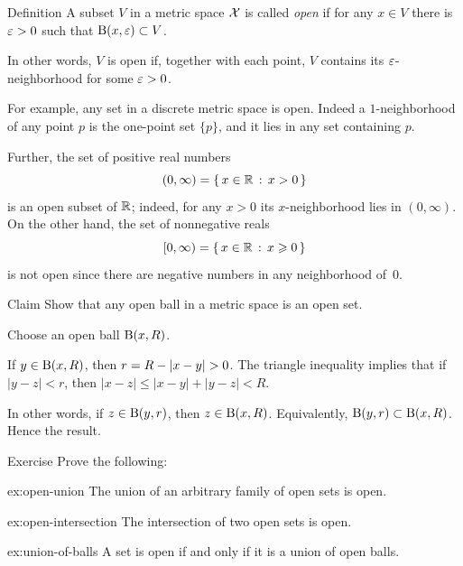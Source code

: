 \begin{thm}{Definition}\label{def:open}
A subset $V$ in a metric space $\mathcal{X}$ is called \emph{open} if for any $x\in V$ there is $\varepsilon>0$ such that $\mathrm{B}(x,\varepsilon)\subset V$.
\end{thm}

In other words, $V$ is open if, together with each point, $V$ contains its $\varepsilon$-neighborhood for some $\varepsilon>0$.

For example, any set in a discrete metric space is open.
Indeed a $1$-neighborhood of any point $p$ is the one-point set $\{p\}$, and it lies in any set containing $p$.

Further, the set of positive real numbers
\[(0,\infty)=\left\{\,{x\in\mathbb{R}}\,:\,{x>0}\,\right\}\] 
is an open subset of $\mathbb{R}$; indeed, for any $x>0$ its $x$-neighborhood lies in $(0,\infty)$.
On the other hand, the set of nonnegative reals 
\[[0,\infty)=\left\{\,{x\in\mathbb{R}}\,:\,{x\geqslant0}\,\right\}\]
is not open since there are negative numbers in any neighborhood of~$0$.

\begin{thm}{Claim}\label{ex:ball-is-open}
Show that any open ball in a metric space is an open set.
\end{thm}



Choose an open ball $\mathrm{B}(x,R)$.

If $y\in \mathrm{B}(x,R)$, then $r=R-|x-y|\z>0$.
The triangle inequality implies that if $|y-z|<r$, then $|x-z|\le |x-y|+|y-z|<R$.

In other words, if $z\in \mathrm{B}(y,r)$, then $z\in \mathrm{B}(x,R)$.
Equivalently, $\Ball(y,r)\z\subset\Ball(x,R)$.
Hence the result.
\qeds

\begin{thm}[!]{Exercise}\label{ex:open-open}
Prove the following:

\begin{subthm}{ex:open-union}
The union of an arbitrary family of open sets is open.
\end{subthm}

\begin{subthm}{ex:open-intersection}
The intersection of two open sets is open.
\end{subthm}

\begin{subthm}{ex:union-of-balls}
A set is open if and only if it is a union of open balls.
\end{subthm}

\end{thm}


